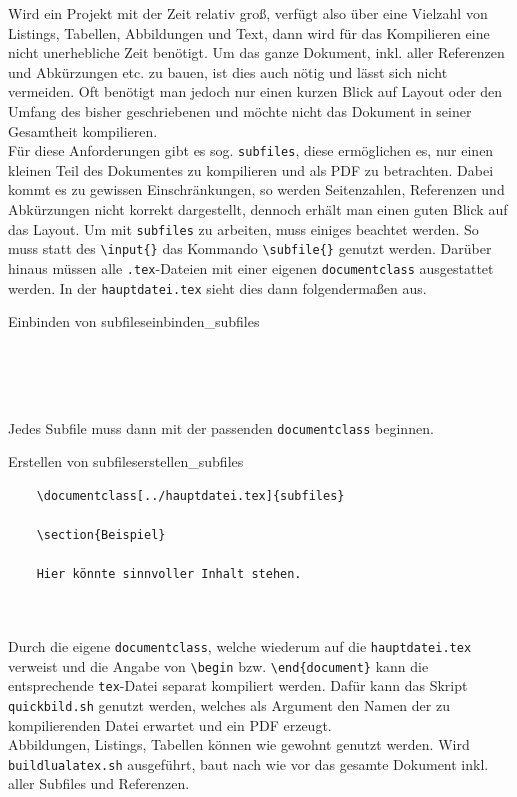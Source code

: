 Wird ein Projekt mit der Zeit relativ groß, verfügt also über eine Vielzahl von
Listings, Tabellen, Abbildungen und Text, dann wird für das Kompilieren eine nicht
unerhebliche Zeit benötigt. Um das ganze Dokument, inkl. aller Referenzen und
Abkürzungen etc. zu bauen, ist dies auch nötig und lässt sich nicht vermeiden.
Oft benötigt man jedoch nur einen kurzen Blick auf Layout oder den Umfang des bisher
geschriebenen und möchte nicht das Dokument in seiner Gesamtheit kompilieren.\\
Für diese Anforderungen gibt es sog. \texttt{subfiles}, diese ermöglichen es, nur
einen kleinen Teil des Dokumentes zu kompilieren und als PDF zu betrachten. Dabei
kommt es zu gewissen Einschränkungen, so werden Seitenzahlen, Referenzen und Abkürzungen
nicht korrekt dargestellt, dennoch erhält man einen guten Blick auf das Layout.
Um mit \texttt{subfiles} zu arbeiten, muss einiges beachtet werden.
So muss statt des \texttt{\textbackslash input\{\}} das Kommando \texttt{\textbackslash subfile\{\}}
genutzt werden. Darüber hinaus müssen alle \texttt{.tex}-Dateien mit einer eigenen \texttt{documentclass}
ausgestattet werden. In der \texttt{hauptdatei.tex} sieht dies dann folgendermaßen aus.

\begin{code}{Einbinden von subfiles}{einbinden_subfiles}
\begin{verbatim}
	
	
	
\end{verbatim}
\end{code}

Jedes Subfile muss dann mit der passenden \texttt{documentclass} beginnen. 

\begin{code}{Erstellen von subfiles}{erstellen_subfiles}
\begin{verbatim}
	\documentclass[../hauptdatei.tex]{subfiles}
	
	\section{Beispiel}

	Hier könnte sinnvoller Inhalt stehen. 

	
\end{verbatim}
\end{code}

Durch die eigene \texttt{documentclass}, welche wiederum auf die \texttt{hauptdatei.tex} verweist und 
die Angabe von \texttt{\textbackslash begin} bzw. \texttt{\textbackslash end\{document\}} kann die entsprechende 
\texttt{tex}-Datei separat kompiliert werden. Dafür kann das Skript \texttt{quickbild.sh} genutzt werden, welches 
als Argument den Namen der zu kompilierenden Datei erwartet und ein PDF erzeugt.\\
Abbildungen, Listings, Tabellen können wie gewohnt genutzt werden. Wird \texttt{buildlualatex.sh} ausgeführt, 
baut nach wie vor das gesamte Dokument inkl. aller Subfiles und Referenzen. 
